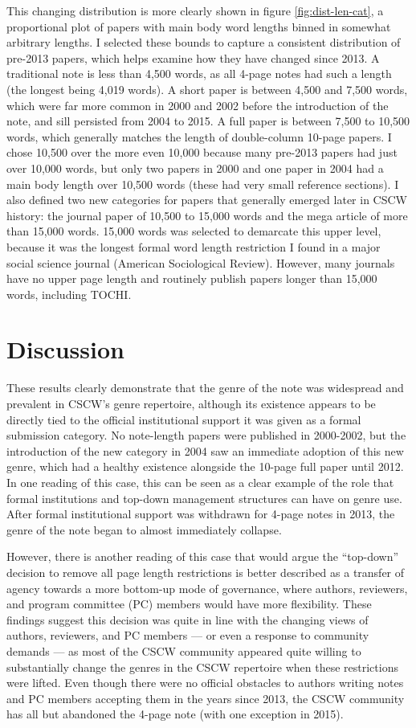 \documentclass[format=acmsmall, screen=true]{acmart}
\begin{document}
This changing distribution is more clearly shown in figure \ref{fig:dist-len-cat}, a proportional plot of papers with main body word lengths binned in somewhat arbitrary lengths. I selected these bounds to capture a consistent distribution of pre-2013 papers, which helps examine how they have changed since 2013. A traditional note is less than 4,500 words, as all 4-page notes had such a length (the longest being 4,019 words). A short paper is between 4,500 and 7,500 words, which were far more common in 2000 and 2002 before the introduction of the note, and sill persisted from 2004 to 2015. A full paper is between 7,500 to 10,500 words, which generally matches the length of double-column 10-page papers. I chose 10,500 over the more even 10,000 because many pre-2013 papers had just over 10,000 words, but only two papers in 2000 and one paper in 2004 had a main body length over 10,500 words (these had very small reference sections). I also defined two new categories for papers that generally emerged later in CSCW history: the journal paper of 10,500 to 15,000 words and the mega article of more than 15,000 words. 15,000 words was selected to demarcate this upper level, because it was the longest formal word length restriction I found in a major social science journal (American Sociological Review). However, many journals have no upper page length and routinely publish papers longer than 15,000 words, including TOCHI.

\section{Discussion}
These results clearly demonstrate that the genre of the note was widespread and prevalent in CSCW's genre repertoire, although its existence appears to be directly tied to the official institutional support it was given as a formal submission category. No note-length papers were published in 2000-2002, but the introduction of the new category in 2004 saw an immediate adoption of this new genre, which had a healthy existence alongside the 10-page full paper until 2012. In one reading of this case, this can be seen as a clear example of the role that formal institutions and top-down management structures can have on genre use. After formal institutional support was withdrawn for 4-page notes in 2013, the genre of the note began to almost immediately collapse. 

However, there is another reading of this case that would argue the ``top-down'' decision to remove all page length restrictions is better described as a transfer of agency towards a more bottom-up mode of governance, where authors, reviewers, and program committee (PC) members would have more flexibility. These findings suggest this decision was quite in line with the changing views of authors, reviewers, and PC members --- or even a response to community demands --- as most of the CSCW community appeared quite willing to substantially change the genres in the CSCW repertoire when these restrictions were lifted. Even though there were no official obstacles to authors writing notes and PC members accepting them in the years since 2013, the CSCW community has all but abandoned the 4-page note (with one exception in 2015). 
\end{document}
